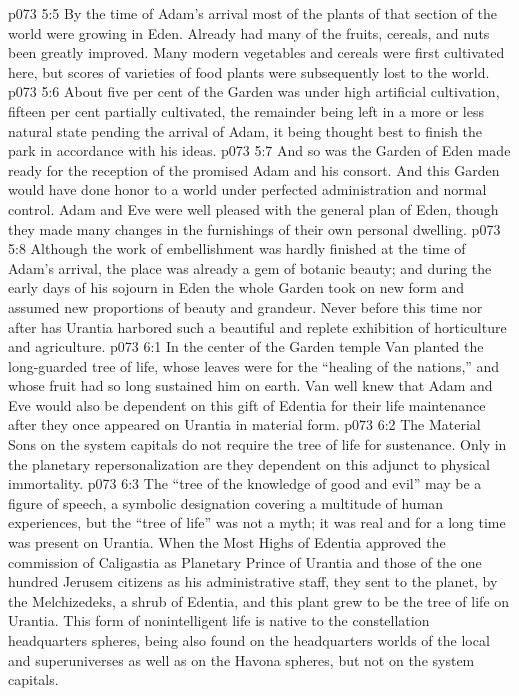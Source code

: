 \vs p073 5:5 By the time of Adam’s arrival most of the plants of that section of the world were growing in Eden. Already had many of the fruits, cereals, and nuts been greatly improved. Many modern vegetables and cereals were first cultivated here, but scores of varieties of food plants were subsequently lost to the world.
\vs p073 5:6 About five per cent of the Garden was under high artificial cultivation, fifteen per cent partially cultivated, the remainder being left in a more or less natural state pending the arrival of Adam, it being thought best to finish the park in accordance with his ideas.
\vs p073 5:7 And so was the Garden of Eden made ready for the reception of the promised Adam and his consort. And this Garden would have done honor to a world under perfected administration and normal control. Adam and Eve were well pleased with the general plan of Eden, though they made many changes in the furnishings of their own personal dwelling.
\vs p073 5:8 Although the work of embellishment was hardly finished at the time of Adam’s arrival, the place was already a gem of botanic beauty; and during the early days of his sojourn in Eden the whole Garden took on new form and assumed new proportions of beauty and grandeur. Never before this time nor after has Urantia harbored such a beautiful and replete exhibition of horticulture and agriculture.
\vs p073 6:1 In the center of the Garden temple Van planted the long\hyp{}guarded tree of life, whose leaves were for the “healing of the nations,” and whose fruit had so long sustained him on earth. Van well knew that Adam and Eve would also be dependent on this gift of Edentia for their life maintenance after they once appeared on Urantia in material form.\plusone
\vs p073 6:2 The Material Sons on the system capitals do not require the tree of life for sustenance. Only in the planetary repersonalization are they dependent on this adjunct to physical immortality.
\pc \vs p073 6:3 The “tree of the knowledge of good and evil” may be a figure of speech, a symbolic designation covering a multitude of human experiences, but the “tree of life” was not a myth; it was real and for a long time was present on Urantia. When the Most Highs of Edentia approved the commission of Caligastia as Planetary Prince of Urantia and those of the one hundred Jerusem citizens as his administrative staff, they sent to the planet, by the Melchizedeks, a shrub of Edentia, and this plant grew to be the tree of life on Urantia. This form of nonintelligent life is native to the constellation headquarters spheres, being also found on the headquarters worlds of the local and superuniverses as well as on the Havona spheres, but not on the system capitals.

